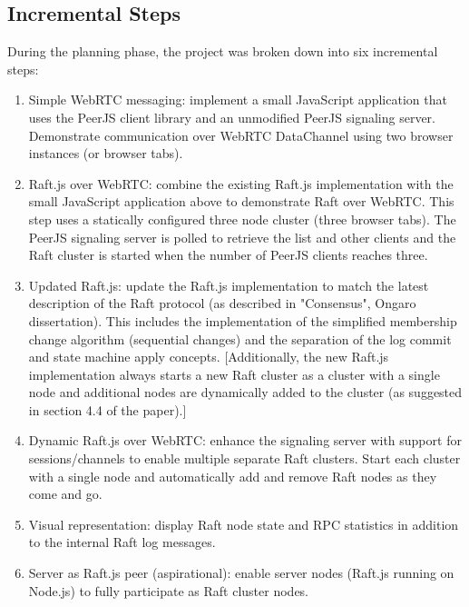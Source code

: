 \documentclass{acmtog} %
\begin{document}
\subsection{Incremental Steps}

During the planning phase, the project was broken down into six
incremental steps:

\begin{enumerate}
\item Simple WebRTC messaging: implement a small JavaScript application that uses the PeerJS client library and an unmodified PeerJS signaling server. Demonstrate communication over WebRTC DataChannel using two browser instances (or browser tabs).

\item Raft.js over WebRTC: combine the existing Raft.js implementation with the small JavaScript application above to demonstrate Raft over WebRTC. This step uses a statically configured three node cluster (three browser tabs). The PeerJS signaling server is polled to retrieve the list and other clients and the Raft cluster is started when the number of PeerJS clients reaches three.

\item Updated Raft.js: update the Raft.js implementation to match the latest description of the Raft protocol (as described in "Consensus", Ongaro dissertation). This includes the implementation of the simplified membership change algorithm (sequential changes) and the separation of the log commit and state machine apply concepts. [Additionally, the new Raft.js implementation always starts a new Raft cluster as a cluster with a single node and additional nodes are dynamically added to the cluster (as suggested in section 4.4 of the paper).]

\item Dynamic Raft.js over WebRTC: enhance the signaling server with support for sessions/channels to enable multiple separate Raft clusters. Start each cluster with a single node and automatically add and remove Raft nodes as they come and go.

\item Visual representation: display Raft node state and RPC statistics in addition to the internal Raft log messages.

\item Server as Raft.js peer (aspirational): enable server nodes (Raft.js running on Node.js) to fully participate as Raft cluster nodes.
\end{enumerate}
\end{document}
